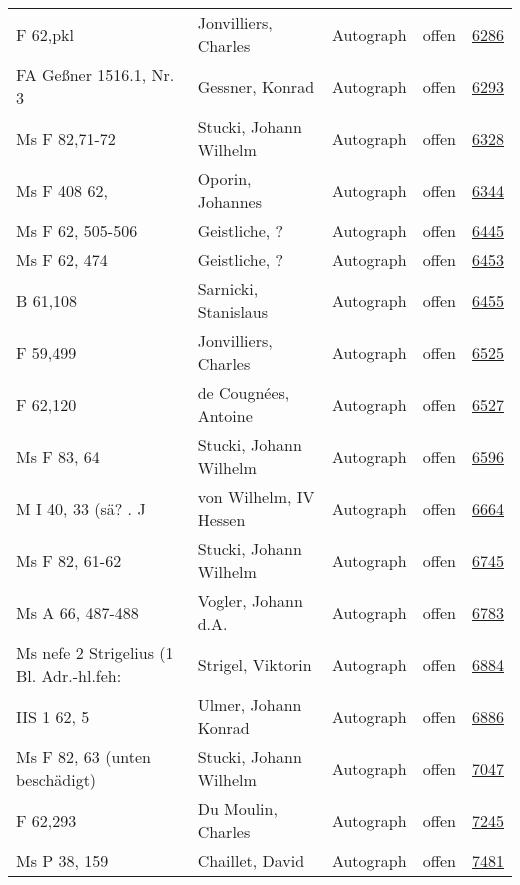 \documentclass[10pt,a4paper,landscape]{report}
\begin{document}
\begin{longtable}{p{16cm}p{4cm}llr}
F 62,pkl	&	Jonvilliers, Charles	&	Autograph	&	offen	&	\href{http://130.60.24.72/assignment/6286}{6286}\\
FA Geßner 1516.1, Nr. 3	&	Gessner, Konrad	&	Autograph	&	offen	&	\href{http://130.60.24.72/assignment/6293}{6293}\\
Ms F 82,71-72	&	Stucki, Johann Wilhelm	&	Autograph	&	offen	&	\href{http://130.60.24.72/assignment/6328}{6328}\\
Ms F 408 62,	&	Oporin, Johannes	&	Autograph	&	offen	&	\href{http://130.60.24.72/assignment/6344}{6344}\\
Ms F 62, 505-506	&	Geistliche, ?	&	Autograph	&	offen	&	\href{http://130.60.24.72/assignment/6445}{6445}\\
Ms F 62, 474	&	Geistliche, ?	&	Autograph	&	offen	&	\href{http://130.60.24.72/assignment/6453}{6453}\\
B 61,108	&	Sarnicki, Stanislaus	&	Autograph	&	offen	&	\href{http://130.60.24.72/assignment/6455}{6455}\\
F 59,499	&	Jonvilliers, Charles	&	Autograph	&	offen	&	\href{http://130.60.24.72/assignment/6525}{6525}\\
F 62,120	&	de Cougnées, Antoine	&	Autograph	&	offen	&	\href{http://130.60.24.72/assignment/6527}{6527}\\
Ms F 83, 64	&	Stucki, Johann Wilhelm	&	Autograph	&	offen	&	\href{http://130.60.24.72/assignment/6596}{6596}\\
M I 40, 33 (sä? . J	&	von Wilhelm, IV  Hessen	&	Autograph	&	offen	&	\href{http://130.60.24.72/assignment/6664}{6664}\\
Ms F 82, 61-62	&	Stucki, Johann Wilhelm	&	Autograph	&	offen	&	\href{http://130.60.24.72/assignment/6745}{6745}\\
Ms A 66, 487-488	&	Vogler, Johann d.A.	&	Autograph	&	offen	&	\href{http://130.60.24.72/assignment/6783}{6783}\\
Ms nefe 2 Strigelius (1 Bl. Adr.-hl.feh:	&	Strigel, Viktorin	&	Autograph	&	offen	&	\href{http://130.60.24.72/assignment/6884}{6884}\\
IIS 1 62, 5	&	Ulmer, Johann Konrad	&	Autograph	&	offen	&	\href{http://130.60.24.72/assignment/6886}{6886}\\
Ms F 82, 63 (unten beschädigt)	&	Stucki, Johann Wilhelm	&	Autograph	&	offen	&	\href{http://130.60.24.72/assignment/7047}{7047}\\
F 62,293	&	Du Moulin, Charles	&	Autograph	&	offen	&	\href{http://130.60.24.72/assignment/7245}{7245}\\
Ms P 38, 159	&	Chaillet, David	&	Autograph	&	offen	&	\href{http://130.60.24.72/assignment/7481}{7481}\\

\end{longtable}
\end{document}
